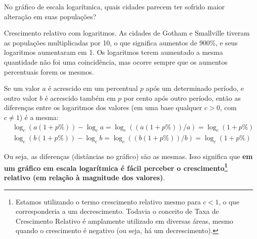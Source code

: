 \begin{reflection}
No gráfico de escala logarítmica, quais cidades parecem ter sofrido maior alteração em suas populações?
\end{reflection}



\begin{observationtitle}{Crescimento relativo com logaritmos.}
As cidades de Gotham e Smallville tiveram as populações multiplicadas por 10, o que significa aumentos de 900\%, e seus logaritmos aumentaram em 1. Os logaritmos terem aumentado a mesma quantidade não foi uma coincidência, mas ocorre sempre que os aumentos percentuais forem os mesmos.

Se um valor $a$ é acrescido em um percentual $p$ após um determinado período, e outro valor $b$ é acrescido também em $p$ por cento após outro período, então as diferenças entre os logaritmos dos valores (em uma base qualquer $c>0$, com $c\neq 1$) é a mesma:
\begin{align*}
&\log_c (a(1+p\%))-\log_c a = \log_c ((a(1+p\%))/a)= \log_c (1+p\%)\\
&\log_c (b(1+p\%))-\log_c b = \log_c ((b(1+p\%))/b)= \log_c (1+p\%)
\end{align*}

Ou seja, as diferenças (distâncias no gráfico) são as mesmas. Isso significa que \textbf{em um gráfico em escala logarítmica é fácil perceber o crescimento\footnote{Estamos utilizando o termo crescimento relativo mesmo para $c<1$, o que corresponderia a um decrescimento. Todavia o conceito de Taxa de Crescimento Relativo é amplamente utilizado em diversas áreas, mesmo quando o crescimento é negativo (ou seja, há um decrescimento).} relativo (em relação à magnitude dos valores)}.
\end{observationtitle}




